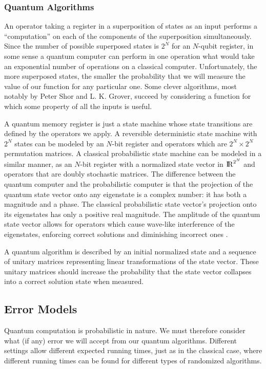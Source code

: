 \subsubsection{Quantum Algorithms}
An operator taking a register in a superposition of states as an input
performs a ``computation'' on each of the components of the
superposition simultaneously.  Since the number of possible superposed
states is $2^{N}$ for an $N$-qubit register, in some sense a quantum
computer can perform in one operation what would take an exponential
number of operations on a classical computer.  Unfortunately, the more
superposed states, the smaller the probability that we will measure
the value of our function for any particular one.  Some clever
algorithms, most notably by Peter Shor and L. K. Grover, succeed by
considering a function for which some property of all the inputs is
useful.

A quantum memory register is just a state machine whose state
transitions are defined by the operators we apply.  A reversible
deterministic state machine with $2^{N}$ states can be modeled by an
$N$-bit register and operators which are $2^{N} \times 2^{N}$
permutation matrices.  A classical probabilistic state machine can be
modeled in a similar manner, as an $N$-bit register with a normalized
state vector in $\mathrm{I\!R}^{2^{N}}$ and operators that are doubly
stochastic matrices.  The difference between the quantum computer and
the probabilistic computer is that the projection of the quantum state
vector onto any eigenstate is a complex number: it has both a
magnitude and a phase.  The classical probabilistic state vector's
projection onto its eigenstates has only a positive real magnitude.
The amplitude of the quantum state vector allows for operators which
cause wave-like interference of the eigenstates, enforcing correct
solutions and diminishing incorrect ones
\cite{grover00search}.  

A quantum algorithm is described by an initial normalized state and a
sequence of unitary matrices representing linear transformations of
the state vector.  These unitary matrices should increase the
probability that the state vector collapses into a correct solution
state when measured.

\subsection{Error Models}
\label{sec:error}

Quantum computation is probabilistic in nature.  We must therefore
consider what (if any) error we will accept from our quantum
algorithms.  Different settings allow different expected running
times, just as in the classical case, where different running times
can be found for different types of randomized algorithms.

